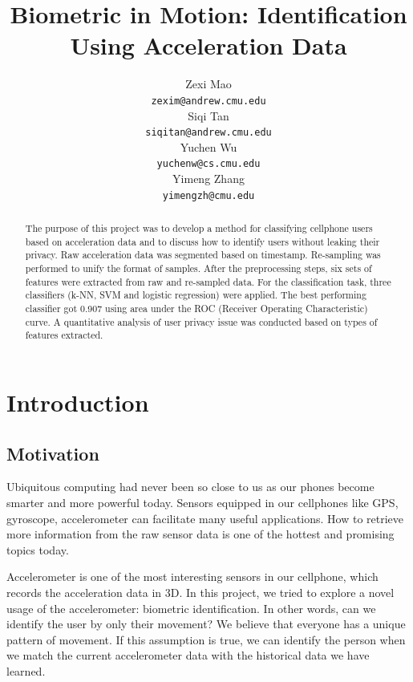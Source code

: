 \documentclass{article} %
\title{Biometric in Motion: Identification Using Acceleration Data}
\author{
Zexi Mao\\
\texttt{zexim@andrew.cmu.edu} \\
\And
Siqi Tan \\
\texttt{siqitan@andrew.cmu.edu} \\
\AND
Yuchen Wu\\
\texttt{yuchenw@cs.cmu.edu} \\
\And
Yimeng Zhang \\
\texttt{yimengzh@cmu.edu} \\
}
\begin{document}
\maketitle

\begin{abstract}
The purpose of this project was to develop a method for classifying cellphone users based on acceleration data and to discuss how to identify users without leaking their privacy. Raw acceleration data was segmented based on timestamp. Re-sampling was performed to unify the format of samples. After the preprocessing steps, six sets of features were extracted from raw and re-sampled data. For the classification task, three classifiers (k-NN, SVM and logistic regression) were applied. The best performing classifier got 0.907 using area under the ROC (Receiver Operating Characteristic) curve. A quantitative analysis of user privacy issue was conducted based on types of features extracted.
\end{abstract}

\section{Introduction}

\subsection{Motivation}

Ubiquitous computing had never been so close to us as our phones become smarter and more powerful today. Sensors equipped in our cellphones like GPS, gyroscope, accelerometer can facilitate many useful applications. How to retrieve more information from the raw sensor data is one of the hottest and promising topics today.

Accelerometer is one of the most interesting sensors in our cellphone, which records the acceleration data in 3D. In this project, we tried to explore a novel usage of the accelerometer: biometric identification. In other words, can we identify the user by only their movement? We believe that everyone has a unique pattern of movement. If this assumption is true, we can identify the person when we match the current accelerometer data with the historical data we have learned. 
\end{document}
